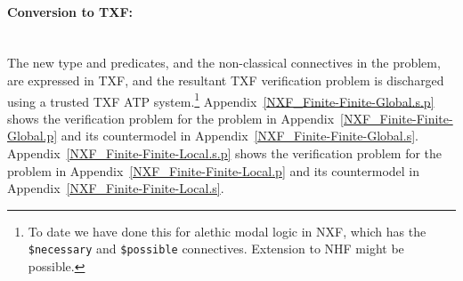 \documentclass{easychair}
\begin{document}
\paragraph{Conversion to TXF:}~\\
The new type and predicates, and the non-classical connectives in the problem, are expressed 
in TXF, and the resultant TXF verification problem is discharged using a trusted TXF 
ATP system.\footnote{%
To date we have done this for alethic modal logic in NXF, which has the {\tt \$necessary} and 
{\tt \$possible} connectives.
Extension to NHF might be possible.}
Appendix~\ref{NXF_Finite-Finite-Global.s.p} shows the verification problem for the problem
in Appendix~\ref{NXF_Finite-Finite-Global.p} and its countermodel in 
Appendix~\ref{NXF_Finite-Finite-Global.s}.
Appendix~\ref{NXF_Finite-Finite-Local.s.p} shows the verification problem for the problem
in Appendix~\ref{NXF_Finite-Finite-Local.p} and its countermodel in 
Appendix~\ref{NXF_Finite-Finite-Local.s}.
\end{document}
